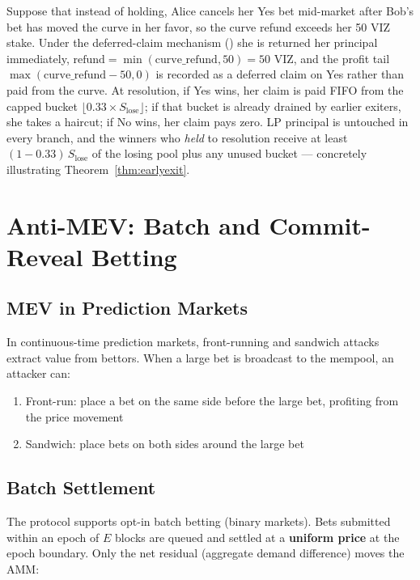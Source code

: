 \documentclass{ledger}
\theoremstyle{plain}
\theoremstyle{remark}
\begin{document}
Suppose that instead of holding, Alice cancels her Yes bet mid-market after
Bob's bet has moved the curve in her favor, so the curve refund exceeds her 50
VIZ stake. Under the deferred-claim mechanism () she is
returned her principal immediately, $\text{refund} = \min(\text{curve\_refund},
50) = 50$ VIZ, and the profit tail $\max(\text{curve\_refund} - 50, 0)$ is
recorded as a deferred claim on Yes rather than paid from the curve. At
resolution, if Yes wins, her claim is paid FIFO from the capped bucket
$\lfloor 0.33 \times S_{\text{lose}} \rfloor$; if that bucket is already drained
by earlier exiters, she takes a haircut; if No wins, her claim pays zero. LP
principal is untouched in every branch, and the winners who \emph{held} to
resolution receive at least $(1 - 0.33)\,S_{\text{lose}}$ of the losing pool plus
any unused bucket --- concretely illustrating Theorem~\ref{thm:earlyexit}.

\section{Anti-MEV: Batch and Commit-Reveal Betting}\label{sec:antimev}

\subsection{MEV in Prediction Markets}

In continuous-time prediction markets, front-running and sandwich attacks
extract value from bettors. When a large bet is broadcast to the mempool, an
attacker can:

\begin{enumerate}
  \item Front-run: place a bet on the same side before the large bet, profiting
  from the price movement
  \item Sandwich: place bets on both sides around the large bet
\end{enumerate}

\subsection{Batch Settlement}

The protocol supports opt-in batch betting (binary markets). Bets submitted
within an epoch of $E$ blocks are queued and settled at a \textbf{uniform price}
at the epoch boundary. Only the net residual (aggregate demand difference) moves
the AMM:
\end{document}
